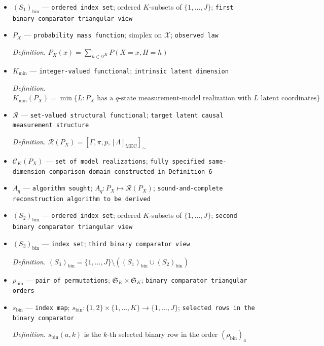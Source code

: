 \documentclass{article}
\begin{document}
\begin{itemize}
  \item \((S_1)_{\mathrm{bin}}\) --- \texttt{ordered index set}; ordered \(K\)-subsets of \(\{1,\ldots,J\}\); \texttt{first binary comparator triangular view}
  \item \(P_X\) --- \texttt{probability mass function}; simplex on \(\mathcal X\); \texttt{observed law}
  \par\smallskip\noindent\emph{Definition.} \(P_X(x)=\sum_{h\in\mathcal Q^K}P(X=x,H=h)\)
  \item \(K_{\min}\) --- \texttt{integer-\allowbreak{}valued functional}; \texttt{intrinsic latent dimension}
  \par\smallskip\noindent\emph{Definition.} \(K_{\min}(P_X)=\min\{L:P_X\text{ has a }q\text{-state measurement-model realization with }L\text{ latent coordinates}\}\)
  \item \(\mathcal R\) --- \texttt{set-\allowbreak{}valued structural functional}; \texttt{target latent causal measurement structure}
  \par\smallskip\noindent\emph{Definition.} \(\mathcal R(P_X)=[\Gamma,\pi,p,[\Lambda]_{\mathrm{MEC}}]_{\sim}\)
  \item \(\mathcal C_K(P_X)\) --- \texttt{set of model realizations}; \texttt{fully specified same-\allowbreak{}dimension comparison domain constructed in Definition 6}
  \item \(A_q\) --- \texttt{algorithm sought}; \(A_q:P_X\mapsto\mathcal R(P_X)\); \texttt{sound-\allowbreak{}and-\allowbreak{}complete reconstruction algorithm to be derived}
  \item \((S_2)_{\mathrm{bin}}\) --- \texttt{ordered index set}; ordered \(K\)-subsets of \(\{1,\ldots,J\}\); \texttt{second binary comparator triangular view}
  \item \((S_3)_{\mathrm{bin}}\) --- \texttt{index set}; \texttt{third binary comparator view}
  \par\smallskip\noindent\emph{Definition.} \((S_3)_{\mathrm{bin}}=\{1,\ldots,J\}\setminus((S_1)_{\mathrm{bin}}\cup(S_2)_{\mathrm{bin}})\)
  \item \(\rho_{\mathrm{bin}}\) --- \texttt{pair of permutations}; \(\mathfrak S_K\times\mathfrak S_K\); \texttt{binary comparator triangular orders}
  \item \(s_{\mathrm{bin}}\) --- \texttt{index map}; \(s_{\mathrm{bin}}:\{1,2\}\times\{1,\ldots,K\}\to\{1,\ldots,J\}\); \texttt{selected rows in the binary comparator}
  \par\smallskip\noindent\emph{Definition.} \(s_{\mathrm{bin}}(a,k)\) is the \(k\)-th selected binary row in the order \((\rho_{\mathrm{bin}})_a\)

\end{itemize}
\end{document}
